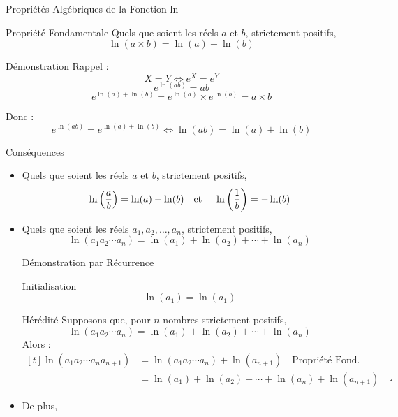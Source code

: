 \documentclass{cours}
\begin{document}
    \begin{Gpartie}{Propriétés Algébriques de la Fonction ln}
        \begin{Spartie}{Propriété Fondamentale}
            Quels que soient les réels $a$ et $b$, strictement positifs, 
            \[\ln(a\times b)=\ln(a)+\ln(b)\]
            \begin{SSpartie}{Démonstration}
                Rappel : \[X=Y\iff e^X=e^Y\]
                \[e^{\ln(ab)}=ab\]
                \[e^{\ln(a)+\ln(b)}=e^{\ln(a)}\times e^{\ln(b)}=a\times b\]

                Donc : \[e^{\ln(ab)}=e^{\ln(a)+\ln(b)}\iff\ln(ab)=\ln(a)+\ln(b)\]
            \end{SSpartie}
        \end{Spartie}
        \begin{Spartie}{Conséquences}
            \begin{itemize} 
                \item Quels que soient les réels $a$ et $b$, strictement positifs, 
                \[\ln\left(\frac{a}{b}\right)=\ln(a)-\ln(b)\text{\quad et \quad}\ln\left(\frac{1}{b}\right)=-\ln(b)\]
                \item Quels que soient les réels $a_1, a_2,\dotsc, a_n$, strictement positifs, 
                \[\ln(a_1a_2\dotsb a_n)=\ln(a_1)+\ln(a_2)+\dotsb+\ln(a_n)\]
                \begin{SSpartie}{Démonstration par Récurrence}
                    \begin{SSSpartie}{Initialisation}
                        \[\ln(a_1)=\ln(a_1)\]
                    \end{SSSpartie}
                    \begin{SSSpartie}{Hérédité}
                        Supposons que, pour $n$ nombres strictement positifs,
                        \[\ln(a_1a_2\dotsb a_n)=\ln(a_1)+\ln(a_2)+\dotsb+\ln(a_n)\]
                        Alors :
                        \[\begin{aligned}[t]
                            \ln(a_1a_2\dotsb a_na_{n+1})&=\ln(a_1a_2\dotsb a_n)+\ln(a_{n+1})\quad\text{Propriété Fond.} \\
                            &=\ln(a_1)+\ln(a_2)+\dotsb+\ln(a_n)+\ln(a_{n+1})\quad\square
                        \end{aligned}\]
                    \end{SSSpartie}
                \end{SSpartie}
                \item De plus, 

\end{itemize}
\end{Spartie}
\end{Gpartie}
\end{document}
